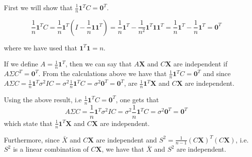 First we will show that $\frac{1}{n}\textbf{1}^T C = \textbf{0}^T$. 

$$\frac{1}{n}\textbf{1}^T C = \frac{1}{n} \textbf{1}^T \left(I - \frac{1}{n} \textbf{1}\textbf{1}^T\right) = \frac{1}{n} \textbf{1}^T - \frac{1}{n^2} \textbf{1}^T \textbf{1}\textbf{1}^T = \frac{1}{n} \textbf{1}^T - \frac{1}{n} \textbf{1}^T = \textbf{0}^T$$

where we have used that $\textbf{1}^T \textbf{1} = n$.

If we define $A = \frac{1}{n} \textbf{1}^T$, then we can say that $A \textbf{X}$ and $C \textbf{X}$ are independent if $A \Sigma C^T = \textbf{0}^T$. From the calculations above we have that $\frac{1}{n}\textbf{1}^T C = \textbf{0}^T$ and since $A\Sigma C =  \frac{1}{n} \textbf{1}^T \sigma^2 I C = \sigma^2 \frac{1}{n} \textbf{1}^TC = \sigma^2 \textbf{0}^T = \textbf{0}^T$, are $\frac{1}{n} \textbf{1}^T \textbf{X}$ and $C\textbf{X}$ are independent. 

Using the above result, i.e $\frac{1}{n}\textbf{1}^T C = \textbf{0}^T$, one gets that
$$
A\Sigma C =  \frac{1}{n} \textbf{1}^T \sigma^2 I C = \sigma^2 \frac{1}{n} \textbf{1}^TC = \sigma^2 \textbf{0}^T = \textbf{0}^T
$$
which state that $\frac{1}{n} \textbf{1}^T \textbf{X}$ and $C\textbf{X}$ are independent. 




Furthermore, since $\bar{X}$ and  $C\textbf{X}$ are independent and $S^2 = \frac{1}{n-1}(C\textbf{X})^T (C\textbf{X})$, i.e. $S^2$ is a linear combination of $C\textbf{X}$, we have that $\bar{X}$ and $S^2$ are independent. 

